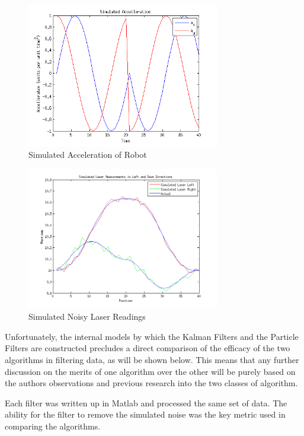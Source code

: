 \documentclass[english]{article}
\begin{document}
\begin{figure}[htp]
\label{fig:simac}
\centering
 \includegraphics[width=0.75\textwidth]{images/simulatedaccelleration.png}
\caption{Simulated Acceleration of Robot}
\end{figure}

\begin{figure}[htp]
\label{fig:siml}
\centering
 \includegraphics[width=0.75\textwidth]{images/simulatedlaser.png}
\caption{Simulated Noisy Laser Readings}
\end{figure}

Unfortunately, the internal models by which the Kalman Filters and the Particle Filters are constructed precludes a direct comparison of the efficacy of the two algorithms in filtering data, as will be shown below. This means that any further discussion on the merits of one algorithm over the other will be purely based on the authors observations and previous research into the two classes of algorithm.

Each filter was written up in Matlab and processed the same set of data. The ability for the filter to remove the simulated noise was the key metric used in comparing the algorithms.
\end{document}
